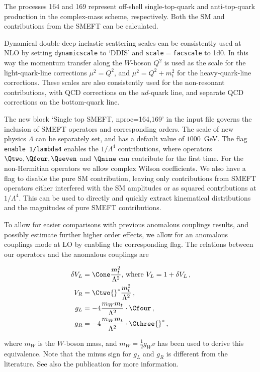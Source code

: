 The processes 164 and 169 represent off-shell single-top-quark and anti-top-quark production
in the complex-mass scheme, respectively. Both the SM and contributions from the SMEFT can be calculated.

Dynamical double deep inelastic scattering scales can be
consistently used at NLO by setting \texttt{dynamicscale} to `DDIS'
and \texttt{scale}$=$\texttt{facscale} to 1d0. In this way the
momentum transfer along the $W$-boson $Q^2$ is used as the scale for
the light-quark-line corrections $\mu^2=Q^2$, and $\mu^2=Q^2+m_t^2$ for
the heavy-quark-line corrections. These scales are also consistently
used for the non-resonant contributions, with QCD corrections on the
$ud$-quark line, and separate QCD corrections on the bottom-quark
line.

The new block `Single top SMEFT, nproc=164,169' in the input
file governs the inclusion of SMEFT operators and corresponding
orders.  The scale of new physics $\Lambda$ can be separately set, and
has a default value of $1000$~GeV.  The flag \texttt{enable
	1/lambda4} enables the $1/\Lambda^4$ contributions, where operators
$\Qtwo, \Qfour, \Qseven$ and $\Qnine$ can contribute for the first
time.  For the non-Hermitian operators we allow complex Wilson
coefficients.  We also have a flag to disable the pure SM
contribution, leaving only contributions from SMEFT operators
either interfered with the SM amplitudes or as squared
contributions at $1/\Lambda^4$.  This can be used to directly and
quickly extract kinematical distributions and the magnitudes of
pure SMEFT contributions.

To allow for easier comparisons with previous anomalous couplings
results, and possibly estimate further higher order effects, we allow
for an anomalous couplings mode at LO by enabling the corresponding
flag.  The relations between our operators and the anomalous couplings
are

\begin{align*}
	 \delta V_L &= \Cone \frac{m_t^2}{\Lambda^2} ,\,\text{where } V_L = 1 + \delta V_L\,,\\
	 V_R &= \Ctwo{}^* \frac{m_t^2}{\Lambda^2}\,, \\
	 g_L &= -4\frac{m_W m_t}{\Lambda^2} \cdot \Cfour\,, \\
	 g_R &= -4 \frac{m_W m_t}{\Lambda^2} \cdot \Cthree{}^*\,,
\end{align*}

where $m_W$ is the $W$-boson mass, and $m_W = \frac{1}{2} g_W v$ has
been used to derive this equivalence.  Note that the minus sign for
$g_L$ and $g_R$ is different from the literature. See also the publication for more information.

